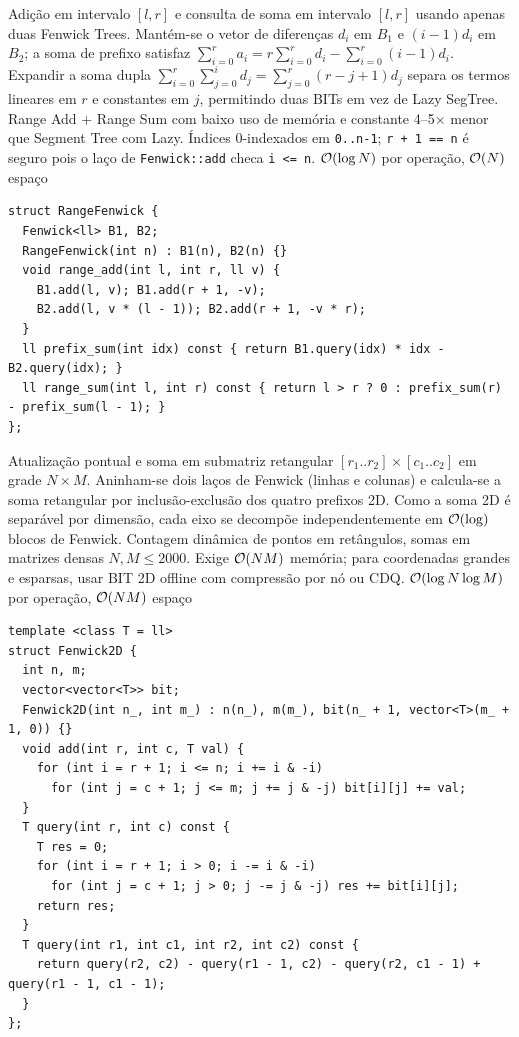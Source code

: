 \algobox
  {Adição em intervalo $[l, r]$ e consulta de soma em intervalo $[l, r]$ usando apenas duas Fenwick Trees.}
  {Mantém-se o vetor de diferenças $d_i$ em $B_1$ e $(i - 1) d_i$ em $B_2$; a soma de prefixo satisfaz $\sum_{i=0}^{r} a_i = r \sum_{i=0}^{r} d_i - \sum_{i=0}^{r} (i - 1) d_i$.}
  {Expandir a soma dupla $\sum_{i=0}^{r} \sum_{j=0}^{i} d_j = \sum_{j=0}^{r} (r - j + 1) d_j$ separa os termos lineares em $r$ e constantes em $j$, permitindo duas BITs em vez de Lazy SegTree.}
  {Range Add + Range Sum com baixo uso de memória e constante 4--5$\times$ menor que Segment Tree com Lazy.}
  {Índices 0-indexados em \texttt{0..n-1}; \texttt{r + 1 == n} é seguro pois o laço de \texttt{Fenwick::add} checa \texttt{i <= n}.}
  {$\mathcal{O}(\log N)$ por operação, $\mathcal{O}(N)$ espaço}

\begin{lstlisting}
struct RangeFenwick {
  Fenwick<ll> B1, B2;
  RangeFenwick(int n) : B1(n), B2(n) {}
  void range_add(int l, int r, ll v) {
    B1.add(l, v); B1.add(r + 1, -v);
    B2.add(l, v * (l - 1)); B2.add(r + 1, -v * r);
  }
  ll prefix_sum(int idx) const { return B1.query(idx) * idx - B2.query(idx); }
  ll range_sum(int l, int r) const { return l > r ? 0 : prefix_sum(r) - prefix_sum(l - 1); }
};
\end{lstlisting}

\algobox
  {Atualização pontual e soma em submatriz retangular $[r_1..r_2] \times [c_1..c_2]$ em grade $N \times M$.}
  {Aninham-se dois laços de Fenwick (linhas e colunas) e calcula-se a soma retangular por inclusão-exclusão dos quatro prefixos 2D.}
  {Como a soma 2D é separável por dimensão, cada eixo se decompõe independentemente em $\mathcal{O}(\log)$ blocos de Fenwick.}
  {Contagem dinâmica de pontos em retângulos, somas em matrizes densas $N, M \le 2000$.}
  {Exige $\mathcal{O}(NM)$ memória; para coordenadas grandes e esparsas, usar BIT 2D offline com compressão por nó ou CDQ.}
  {$\mathcal{O}(\log N \log M)$ por operação, $\mathcal{O}(NM)$ espaço}

\begin{lstlisting}
template <class T = ll>
struct Fenwick2D {
  int n, m;
  vector<vector<T>> bit;
  Fenwick2D(int n_, int m_) : n(n_), m(m_), bit(n_ + 1, vector<T>(m_ + 1, 0)) {}
  void add(int r, int c, T val) {
    for (int i = r + 1; i <= n; i += i & -i)
      for (int j = c + 1; j <= m; j += j & -j) bit[i][j] += val;
  }
  T query(int r, int c) const {
    T res = 0;
    for (int i = r + 1; i > 0; i -= i & -i)
      for (int j = c + 1; j > 0; j -= j & -j) res += bit[i][j];
    return res;
  }
  T query(int r1, int c1, int r2, int c2) const {
    return query(r2, c2) - query(r1 - 1, c2) - query(r2, c1 - 1) + query(r1 - 1, c1 - 1);
  }
};
\end{lstlisting}

